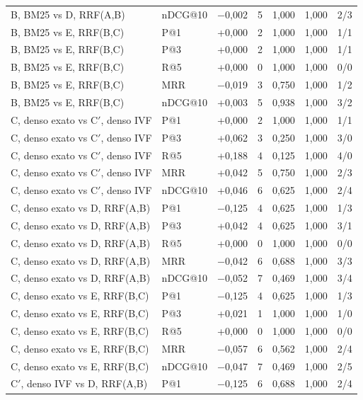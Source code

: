 {\begin{longtable}{llccccl}
B, BM25 vs D, RRF(A,B) & nDCG@10 & $-$0{,}002 & 5 & 1{,}000 & 1{,}000 & 2/3 \\
B, BM25 vs E, RRF(B,C) & P@1 & +0{,}000 & 2 & 1{,}000 & 1{,}000 & 1/1 \\
B, BM25 vs E, RRF(B,C) & P@3 & +0{,}000 & 2 & 1{,}000 & 1{,}000 & 1/1 \\
B, BM25 vs E, RRF(B,C) & R@5 & +0{,}000 & 0 & 1{,}000 & 1{,}000 & 0/0 \\
B, BM25 vs E, RRF(B,C) & MRR & $-$0{,}019 & 3 & 0{,}750 & 1{,}000 & 1/2 \\
B, BM25 vs E, RRF(B,C) & nDCG@10 & +0{,}003 & 5 & 0{,}938 & 1{,}000 & 3/2 \\
C, denso exato vs C$'$, denso IVF & P@1 & +0{,}000 & 2 & 1{,}000 & 1{,}000 & 1/1 \\
C, denso exato vs C$'$, denso IVF & P@3 & +0{,}062 & 3 & 0{,}250 & 1{,}000 & 3/0 \\
C, denso exato vs C$'$, denso IVF & R@5 & +0{,}188 & 4 & 0{,}125 & 1{,}000 & 4/0 \\
C, denso exato vs C$'$, denso IVF & MRR & +0{,}042 & 5 & 0{,}750 & 1{,}000 & 2/3 \\
C, denso exato vs C$'$, denso IVF & nDCG@10 & +0{,}046 & 6 & 0{,}625 & 1{,}000 & 2/4 \\
C, denso exato vs D, RRF(A,B) & P@1 & $-$0{,}125 & 4 & 0{,}625 & 1{,}000 & 1/3 \\
C, denso exato vs D, RRF(A,B) & P@3 & +0{,}042 & 4 & 0{,}625 & 1{,}000 & 3/1 \\
C, denso exato vs D, RRF(A,B) & R@5 & +0{,}000 & 0 & 1{,}000 & 1{,}000 & 0/0 \\
C, denso exato vs D, RRF(A,B) & MRR & $-$0{,}042 & 6 & 0{,}688 & 1{,}000 & 3/3 \\
C, denso exato vs D, RRF(A,B) & nDCG@10 & $-$0{,}052 & 7 & 0{,}469 & 1{,}000 & 3/4 \\
C, denso exato vs E, RRF(B,C) & P@1 & $-$0{,}125 & 4 & 0{,}625 & 1{,}000 & 1/3 \\
C, denso exato vs E, RRF(B,C) & P@3 & +0{,}021 & 1 & 1{,}000 & 1{,}000 & 1/0 \\
C, denso exato vs E, RRF(B,C) & R@5 & +0{,}000 & 0 & 1{,}000 & 1{,}000 & 0/0 \\
C, denso exato vs E, RRF(B,C) & MRR & $-$0{,}057 & 6 & 0{,}562 & 1{,}000 & 2/4 \\
C, denso exato vs E, RRF(B,C) & nDCG@10 & $-$0{,}047 & 7 & 0{,}469 & 1{,}000 & 2/5 \\
C$'$, denso IVF vs D, RRF(A,B) & P@1 & $-$0{,}125 & 6 & 0{,}688 & 1{,}000 & 2/4 \\

\end{longtable}}
